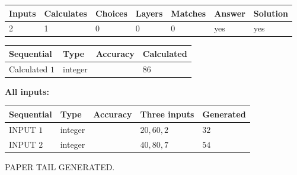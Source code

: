 \documentclass[12pt]{article}
\begin{document}
 
\noindent{}
 
 

 
   
   
   
   
\noindent\begin{tabular}{|l|l|l|l|l|l|l|}
 \hline
Inputs & Calculates & Choices & Layers & Matches & Answer & Solution \\ \hline
 2  & 
 1  & 
 0
  & 
 0  & 
 0  & 
  yes & 
  yes 
  \\ \hline
 \end{tabular}
   
   
   
   
\noindent{}
   
   
  
  
\noindent\begin{tabular}{|l|l|l|l|}
\hline
 Sequential & Type & Accuracy & Calculated \\ 
\hline
 
 
  Calculated $  1 $ & integer &  & 
  $ 86 $ 
 \\  \hline  
 \end{tabular}
   
   
   
   
\noindent\vspace{0.1in}\hspace{-0.08in} {\textbf{\Large{All inputs: }}}
   
   
  
  
\noindent\begin{tabular}{|l|l|l|l|l|}
\hline
 Sequential & Type & Accuracy & Three inputs & Generated \\ 
\hline
 
 
  INPUT $  1 $ & integer &  & $
 20
 , 
 60
 , 
 2
 $ & $ 32 $ 
 \\  \hline  
 
 
  INPUT $  2 $ & integer &  & $
 40
 , 
 80
 , 
 7
 $ & $ 54 $ 
 \\  \hline  
 \end{tabular}
   
   
   
   
   
   
 \vspace{0.2in}
 
   
   
\vspace{2.0in} PAPER TAIL GENERATED.
   
\end{document}

